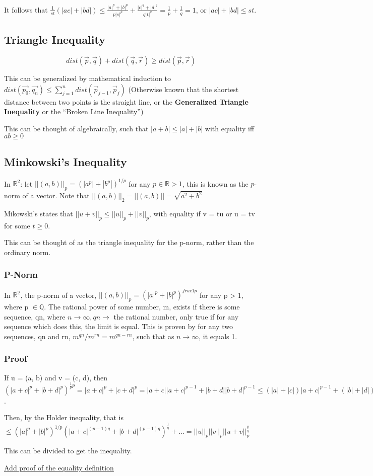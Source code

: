 It follows that $\frac{1}{st}(|ac| + |bd|) \leq \frac{|a|^p + |b|^p}{p|s|^p} + \frac{|c|^q + |d|^q}{q|t|^q} = \frac{1}{p} + \frac{1}{q} = 1$, or $|ac| + |bd| \leq st$.

\subsection{Triangle Inequality}
$$dist(\vec{p}, \vec{q}) + dist(\vec{q}, \vec{r}) \geq dist(\vec{p}, \vec{r})$$

This can be generalized by mathematical induction to $dist(\vec{p_0}, \vec{q_n})
\leq \sum_{j = 1}^n dist(\vec{p}_{j - 1}, \vec{p}_{j})$ (Otherwise known that the
shortest distance between two points is the straight line, or the \textbf{Generalized
Triangle Inequality} or the ``Broken Line Inequality'')

This can be thought of algebraically, such that $|a + b| \leq |a| + |b|$ with equality iff $ab \geq 0$

\subsection{Minkowski's Inequality}
In $\mathbb{R}^2$: let $||(a, b)||_p = (|a^p| + |b^p|)^{1/p}$ for any $p \in \mathbb{R} > 1$, this is known as the $p$-norm of a vector. Note that $||(a,b)||_2 = ||(a, b)|| = \sqrt{a^2 + b^2}$

Mikowski's states that $||u + v||_p \leq ||u||_p + ||v||_p$, with equality if v = tu or u = tv for some $t \geq 0$.

This can be thought of as the triangle inequality for the p-norm, rather than the ordinary norm.

\subsubsection{P-Norm}
In $\mathbb{R^2}$, the p-norm of a vector, $||(a, b)||_p = (|a|^p + |b|^p)^{frac{1}{p}}$ for any p > 1, where p $\in \mathbb{Q}$.
The rational power of some number, m,  exists if there is some sequence, qn, where $n \to \infty, qn \to$ the rational number, only true if for any sequence which does this, the limit is equal.
This is proven by for any two sequences, qn and rn, $m^{qn}/m^{rn} = m^{qn-rn}$, such that as $n \to \infty$, it equals 1.

\subsubsection{Proof}
If u = (a, b) and v = (c, d), then $(|a+c|^p + |b+d|^p)^{\frac{1}{p}p} = |a+c|^p + |c+d|^p = |a+c||a+c|^{p-1} + |b+d||b+d|^{p-1} \leq (|a| + |c|)|a+c|^{p-1} + (|b| + |d|)|b+d|^{p-1} = |a||a+c|^{p-1} + |b||b+d|^{p-1} + |c||a+c|^{p-1} + |d||b+d|^{p-1}$.

Then, by the Holder inequality, that is $\leq (|a|^p + |b|^p)^{1/p}(|a+c|^{(p-1)q} + |b+d|^{(p-1)q})^{\frac{1}{q}} + ... = ||u||_p||v||_p||u+v||_p^{\frac{p}{q}}$

This can be divided to get the inequality.

\underline{Add proof of the equality definition}



